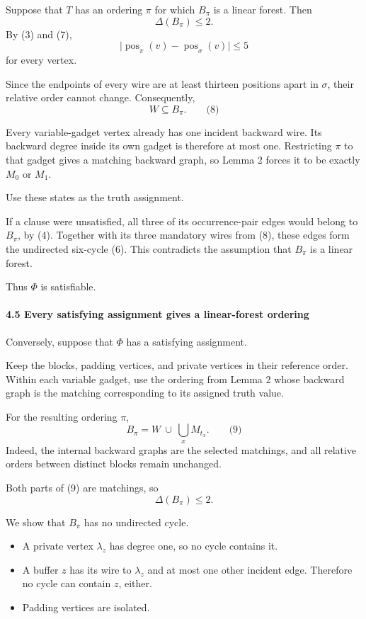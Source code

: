 \documentclass[
  11pt,
  a4paper,
]{article}
\providecommand{\tightlist}{%
  \setlength{\itemsep}{0pt}\setlength{\parskip}{0pt}}
\begin{document}
Suppose that \(T\) has an ordering \(\pi\) for which \(B_\pi\) is a
linear forest. Then \[
\Delta(B_\pi)\le2.
\] By (3) and (7), \[
\bigl|\operatorname{pos}_\pi(v)-\operatorname{pos}_\sigma(v)\bigr|\le5
\] for every vertex.

Since the endpoints of every wire are at least thirteen positions apart
in \(\sigma\), their relative order cannot change. Consequently, \[
W\subseteq B_\pi. \qquad\text{(8)}
\]

Every variable-gadget vertex already has one incident backward wire. Its
backward degree inside its own gadget is therefore at most one.
Restricting \(\pi\) to that gadget gives a matching backward graph, so
Lemma 2 forces it to be exactly \(M_0\) or \(M_1\).

Use these states as the truth assignment.

If a clause were unsatisfied, all three of its occurrence-pair edges
would belong to \(B_\pi\), by (4). Together with its three mandatory
wires from (8), these edges form the undirected six-cycle (6). This
contradicts the assumption that \(B_\pi\) is a linear forest.

Thus \(\Phi\) is satisfiable.

\paragraph{4.5 Every satisfying assignment gives a linear-forest
ordering}\label{every-satisfying-assignment-gives-a-linear-forest-ordering}

Conversely, suppose that \(\Phi\) has a satisfying assignment.

Keep the blocks, padding vertices, and private vertices in their
reference order. Within each variable gadget, use the ordering from
Lemma 2 whose backward graph is the matching corresponding to its
assigned truth value.

For the resulting ordering \(\pi\), \[
B_\pi=W\ \cup\ \bigcup_x M_{t_x}. \qquad\text{(9)}
\] Indeed, the internal backward graphs are the selected matchings, and
all relative orders between distinct blocks remain unchanged.

Both parts of (9) are matchings, so \[
\Delta(B_\pi)\le2.
\]

We show that \(B_\pi\) has no undirected cycle.

\begin{itemize}
\tightlist
\item
  A private vertex \(\lambda_z\) has degree one, so no cycle contains
  it.
\item
  A buffer \(z\) has its wire to \(\lambda_z\) and at most one other
  incident edge. Therefore no cycle can contain \(z\), either.
\item
  Padding vertices are isolated.
\end{itemize}
\end{document}

